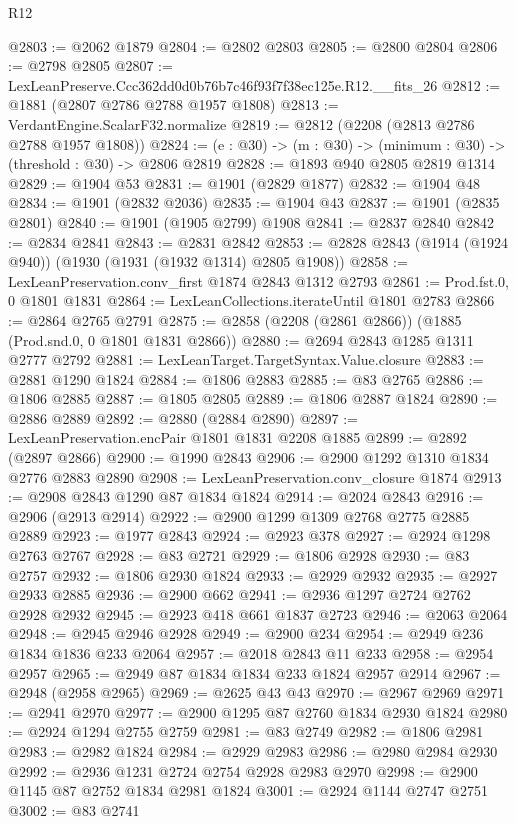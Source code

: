 \begin{lexlean}{R12}
\begin{coremodule}
@2803 := @2062 @1879
@2804 := @2802 @2803
@2805 := @2800 @2804
@2806 := @2798 @2805
@2807 := LexLeanPreserve.Ccc362dd0d0b76b7c46f93f7f38ec125e.R12.__fits_26
@2812 := @1881 (@2807 @2786 @2788 @1957 @1808)
@2813 := VerdantEngine.ScalarF32.normalize
@2819 := @2812 (@2208 (@2813 @2786 @2788 @1957 @1808))
@2824 := (e : @30) -> (m : @30) -> (minimum : @30) -> (threshold : @30) -> @2806 @2819
@2828 := @1893 @940 @2805 @2819 @1314
@2829 := @1904 @53
@2831 := @1901 (@2829 @1877)
@2832 := @1904 @48
@2834 := @1901 (@2832 @2036)
@2835 := @1904 @43
@2837 := @1901 (@2835 @2801)
@2840 := @1901 (@1905 @2799) @1908
@2841 := @2837 @2840
@2842 := @2834 @2841
@2843 := @2831 @2842
@2853 := @2828 @2843 (@1914 (@1924 @940)) (@1930 (@1931 (@1932 @1314) @2805 @1908))
@2858 := LexLeanPreservation.conv_first @1874 @2843 @1312 @2793
@2861 := Prod.fst.{0, 0} @1801 @1831
@2864 := LexLeanCollections.iterateUntil @1801 @2783
@2866 := @2864 @2765 @2791
@2875 := @2858 (@2208 (@2861 @2866)) (@1885 (Prod.snd.{0, 0} @1801 @1831 @2866))
@2880 := @2694 @2843 @1285 @1311 @2777 @2792
@2881 := LexLeanTarget.TargetSyntax.Value.closure
@2883 := @2881 @1290 @1824
@2884 := @1806 @2883
@2885 := @83 @2765
@2886 := @1806 @2885
@2887 := @1805 @2805
@2889 := @1806 @2887 @1824
@2890 := @2886 @2889
@2892 := @2880 (@2884 @2890)
@2897 := LexLeanPreservation.encPair @1801 @1831 @2208 @1885
@2899 := @2892 (@2897 @2866)
@2900 := @1990 @2843
@2906 := @2900 @1292 @1310 @1834 @2776 @2883 @2890
@2908 := LexLeanPreservation.conv_closure @1874
@2913 := @2908 @2843 @1290 @87 @1834 @1824
@2914 := @2024 @2843
@2916 := @2906 (@2913 @2914)
@2922 := @2900 @1299 @1309 @2768 @2775 @2885 @2889
@2923 := @1977 @2843
@2924 := @2923 @378
@2927 := @2924 @1298 @2763 @2767
@2928 := @83 @2721
@2929 := @1806 @2928
@2930 := @83 @2757
@2932 := @1806 @2930 @1824
@2933 := @2929 @2932
@2935 := @2927 @2933 @2885
@2936 := @2900 @662
@2941 := @2936 @1297 @2724 @2762 @2928 @2932
@2945 := @2923 @418 @661 @1837 @2723
@2946 := @2063 @2064
@2948 := @2945 @2946 @2928
@2949 := @2900 @234
@2954 := @2949 @236 @1834 @1836 @233 @2064
@2957 := @2018 @2843 @11 @233
@2958 := @2954 @2957
@2965 := @2949 @87 @1834 @1834 @233 @1824 @2957 @2914
@2967 := @2948 (@2958 @2965)
@2969 := @2625 @43 @43
@2970 := @2967 @2969
@2971 := @2941 @2970
@2977 := @2900 @1295 @87 @2760 @1834 @2930 @1824
@2980 := @2924 @1294 @2755 @2759
@2981 := @83 @2749
@2982 := @1806 @2981
@2983 := @2982 @1824
@2984 := @2929 @2983
@2986 := @2980 @2984 @2930
@2992 := @2936 @1231 @2724 @2754 @2928 @2983 @2970
@2998 := @2900 @1145 @87 @2752 @1834 @2981 @1824
@3001 := @2924 @1144 @2747 @2751
@3002 := @83 @2741

\end{coremodule}
\end{lexlean}
